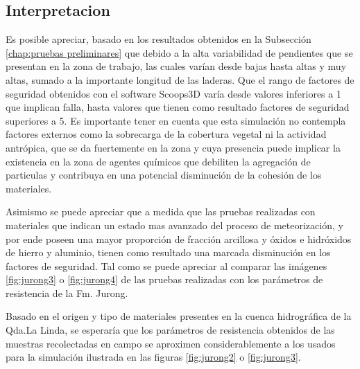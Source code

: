 \subsection{Interpretacion}
Es posible  apreciar, basado en los resultados obtenidos en la Subsecci\'on \ref{chap:pruebas preliminares} que debido a la alta variabilidad de pendientes que se presentan en la zona de trabajo, las cuales var\'ian desde bajas hasta altas y muy altas, sumado a la importante longitud de las laderas. Que el rango de factores de seguridad obtenidos con el software Scoops3D var\'ia desde valores inferiores a 1 que implican falla, hasta valores que tienen como resultado factores de seguridad superiores a 5.
Es importante tener en cuenta que esta simulaci\'on no contempla factores externos como la sobrecarga de la cobertura vegetal ni la actividad antr\'opica, que se da fuertemente en la zona y cuya presencia puede implicar la existencia en la zona de agentes qu\'imicos que debiliten la agregaci\'on de particulas y contribuya en una potencial disminuci\'on de la cohesi\'on de los materiales.

Asimismo se puede apreciar que a medida que las pruebas realizadas con materiales que indican un estado mas avanzado del proceso de meteorizaci\'on, y por ende poseen una mayor proporci\'on de fracci\'on arcillosa y \'oxidos e hidr\'oxidos de hierro y aluminio, tienen como resultado una marcada disminuci\'on en los factores de seguridad. Tal como se puede apreciar al comparar las im\'agenes \ref{fig:jurong3} o \ref{fig:jurong4} de las pruebas realizadas con los par\'ametros de resistencia de la Fm. Jurong.

Basado en el origen y tipo de materiales presentes en la cuenca hidrogr\'afica de la Qda.La Linda, se esperar\'ia que los par\'ametros de resistencia obtenidos de las muestras recolectadas en campo se aproximen considerablemente a los usados para la simulaci\'on ilustrada en las figuras \ref{fig:jurong2} o \ref{fig:jurong3}.  


